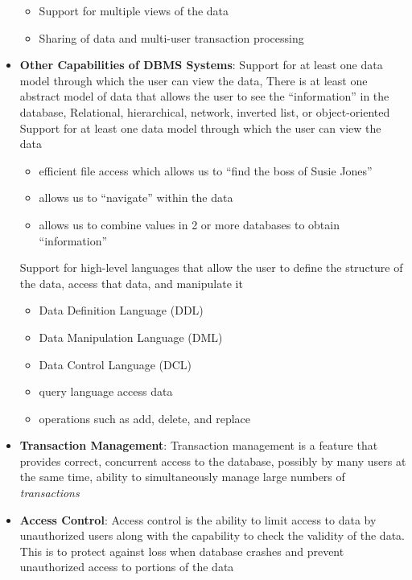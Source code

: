 \documentclass{report}
\begin{document}
\begin{itemize}
\begin{itemize}
                \item Support for multiple views of the data
                \item Sharing of data and multi-user transaction processing
            \end{itemize}
        \item \textbf{Other Capabilities of DBMS Systems}: Support for at least one data model through which the user can view the data, There is at least one abstract model of data that allows the user to see the “information” in the database, Relational, hierarchical, network, inverted list, or object-oriented
            \bigbreak \noindent 
            Support for at least one data model through which the user can view the data
            \begin{itemize}
                \item efficient file access which allows us to “find the boss of Susie Jones”
                \item allows us to “navigate” within the data
                \item allows us to combine values in 2 or more databases to obtain “information”
            \end{itemize}
            \bigbreak \noindent 
            Support for high-level languages that allow the user to define the structure of the data, access that data, and manipulate it
            \begin{itemize}
                \item Data Definition Language (DDL)
                \item Data Manipulation Language (DML)
                \item Data Control Language (DCL)
                \item query language access data
                \item operations such as add, delete, and replace
            \end{itemize}
        \item \textbf{Transaction Management}: Transaction management is a feature that provides correct, concurrent access to the database, possibly by many users at the same time, ability to simultaneously manage large numbers of \textit{transactions}
        \item \textbf{Access Control}: Access control is the ability to limit access to data by unauthorized users along with the capability to check the validity of the data. This is to protect against loss when database crashes and prevent unauthorized access to portions of the data

\end{itemize}
\end{document}
